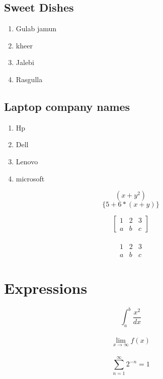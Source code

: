 \documentclass[12pt]{article}
\begin{document}
\subsection*{Sweet Dishes}
\begin{enumerate}
    \item Gulab jamun
    \item  kheer
    \item  Jalebi
    \item  Rasgulla
\end{enumerate}
\subsection*{Laptop company names}
\begin{enumerate}
    \item Hp
    \item Dell
    \item Lenovo
    \item microsoft
\end{enumerate}
 
  \[ ( x + y^2 ) \] 
 \[ \{ 5 + 6 *( x + y) \} \]

\[
\begin{bmatrix}
1 & 2 & 3\\
a & b & c
\end{bmatrix}
\]
\\
\[
\begin{matrix}
1 & 2 & 3\\
a & b & c
\end{matrix}
\]

\section*{Expressions}
    \[ \int_ a^b \frac{x^2}{dx} \]
 \\
 \[\lim_{x\to\infty} f(x) \]
 \\
 \[\sum_{n=1}^{\infty} 2^{-n} = 1 \]
\end{document}

